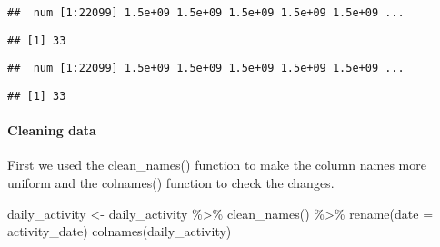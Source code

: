 \documentclass[
]{article}
\newenvironment{Shaded}{\begin{snugshade}}{\end{snugshade}}
\newcommand{\AttributeTok}[1]{\textcolor[rgb]{0.77,0.63,0.00}{#1}}
\newcommand{\FunctionTok}[1]{\textcolor[rgb]{0.00,0.00,0.00}{#1}}
\newcommand{\NormalTok}[1]{#1}
\newcommand{\OtherTok}[1]{\textcolor[rgb]{0.56,0.35,0.01}{#1}}
\newcommand{\SpecialCharTok}[1]{\textcolor[rgb]{0.00,0.00,0.00}{#1}}
\begin{document}
\begin{verbatim}
##  num [1:22099] 1.5e+09 1.5e+09 1.5e+09 1.5e+09 1.5e+09 ...
\end{verbatim}

\begin{Shaded}
\end{Shaded}

\begin{verbatim}
## [1] 33
\end{verbatim}

\begin{Shaded}
\end{Shaded}

\begin{verbatim}
##  num [1:22099] 1.5e+09 1.5e+09 1.5e+09 1.5e+09 1.5e+09 ...
\end{verbatim}

\begin{Shaded}
\end{Shaded}

\begin{verbatim}
## [1] 33
\end{verbatim}

\hypertarget{cleaning-data}{%
\paragraph{Cleaning data}\label{cleaning-data}}

First we used the clean\_names() function to make the column names more
uniform and the colnames() function to check the changes.

\begin{Shaded}
\begin{Highlighting}[]
\NormalTok{daily\_activity }\OtherTok{\textless{}{-}}\NormalTok{ daily\_activity }\SpecialCharTok{\%\textgreater{}\%}
  \FunctionTok{clean\_names}\NormalTok{() }\SpecialCharTok{\%\textgreater{}\%}
  \FunctionTok{rename}\NormalTok{(}\AttributeTok{date =}\NormalTok{ activity\_date)}
\FunctionTok{colnames}\NormalTok{(daily\_activity)}
\end{Highlighting}
\end{Shaded}
\end{document}
